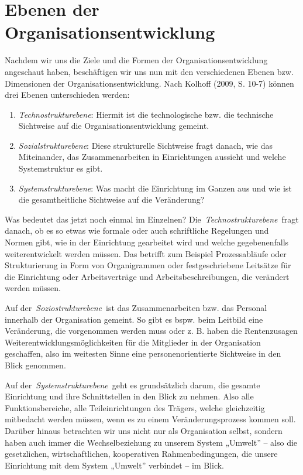 \documentclass[
  letterpaper,
]{book}
\begin{document}
\section{Ebenen der
Organisationsentwicklung}\label{ebenen-der-organisationsentwicklung}

Nachdem wir uns die Ziele und die Formen der Organisationsentwicklung
angeschaut haben, beschäftigen wir uns nun mit den verschiedenen Ebenen
bzw. Dimensionen der Organisationsentwicklung. Nach Kolhoff (2009, S.
10-7) können drei Ebenen unterschieden werden:

\begin{enumerate}
\def\labelenumi{\arabic{enumi}.}
\item
  \emph{Technostrukturebene}: Hiermit ist die technologische bzw. die
  technische Sichtweise auf die Organisationsentwicklung gemeint.
\item
  \emph{Sozialstrukturebene}: Diese strukturelle Sichtweise fragt
  danach, wie das Miteinander, das Zusammenarbeiten in Einrichtungen
  aussieht und welche Systemstruktur es gibt.
\item
  \emph{Systemstrukturebene}: Was macht die Einrichtung im Ganzen aus
  und wie ist die gesamtheitliche Sichtweise auf die Veränderung?
\end{enumerate}

Was bedeutet das jetzt noch einmal im Einzelnen?
Die~\emph{Technostrukturebene}~fragt danach, ob es so etwas wie formale
oder auch schriftliche Regelungen und Normen gibt, wie in der
Einrichtung gearbeitet wird und welche gegebenenfalls weiterentwickelt
werden müssen. Das betrifft zum Beispiel Prozessabläufe oder
Strukturierung in Form von Organigrammen oder festgeschriebene Leitsätze
für die Einrichtung oder Arbeitsverträge und Arbeitsbeschreibungen, die
verändert werden müssen.

Auf der~\emph{Soziostrukturebene}~ist das Zusammenarbeiten bzw. das
Personal innerhalb der Organisation gemeint. So gibt es bspw. beim
Leitbild eine Veränderung, die vorgenommen werden muss oder z. B. haben
die Rentenzusagen Weiterentwicklungsmöglichkeiten für die Mitglieder in
der Organisation geschaffen, also im weitesten Sinne eine
personenorientierte Sichtweise in den Blick genommen.

Auf der~\emph{Systemstrukturebene}~geht es grundsätzlich darum, die
gesamte Einrichtung und ihre Schnittstellen in den Blick zu nehmen. Also
alle Funktionsbereiche, alle Teileinrichtungen des Trägers, welche
gleichzeitig mitbedacht werden müssen, wenn es zu einem
Veränderungsprozess kommen soll. Darüber hinaus betrachten wir uns nicht
nur als Organisation selbst, sondern haben auch immer die
Wechselbeziehung zu unserem System „Umwelt'' -- also die gesetzlichen,
wirtschaftlichen, kooperativen Rahmenbedingungen, die unsere Einrichtung
mit dem System „Umwelt'' verbindet -- im Blick.
\end{document}
